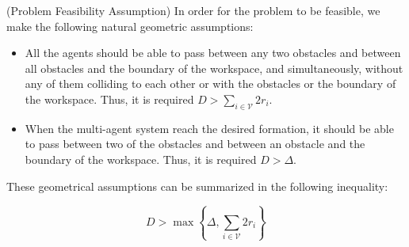 \begin{assumption}(Problem Feasibility Assumption)
	In order for the problem to be feasible, we make the following natural
  geometric assumptions:

	\begin{itemize}
		\item All the agents should be able to pass between any two obstacles
      and between all obstacles and the boundary of the workspace, and
      simultaneously, without any of them colliding to each other or with the
      obstacles or the boundary of the workspace.
      Thus, it is required $D >  \sum_{i \in \mathcal{V}}^{} 2r_i$.
		\item When the multi-agent system reach the desired formation, it should be
      able to pass between two of the obstacles and between an obstacle and the
      boundary of the workspace. Thus, it is required $D > \Delta$.
	\end{itemize}

	These geometrical assumptions can be summarized in the following
  inequality:

	\begin{equation} \label{eq:geometric_constraint}
    D > \max\left\{\Delta, \sum_{i \in \mathcal{V}}^{} 2r_i \right\}
	\end{equation}

\end{assumption}
